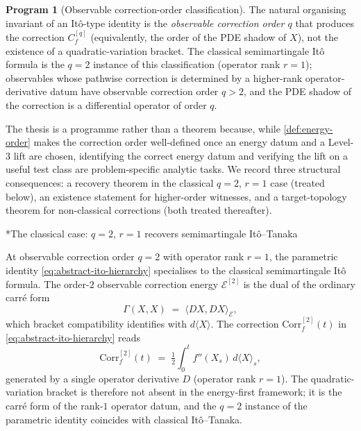 \documentclass[11pt,reqno]{amsart}
\makeatletter
\renewcommand\subsection{\@startsection{subsection}{2}%
  \z@{.7\linespacing}{.5\linespacing}%
  {\normalfont\centering\scshape}}
\theoremstyle{plain}
\theoremstyle{definition}
\newtheorem{program}[theorem]{Program}
\theoremstyle{remark}
\newcommand{\Energy}{\mathcal{E}}
\newcommand{\Carre}{\Gamma}
\makeatother
\begin{document}
\begin{program}[Observable correction-order classification]\label{prog:energy-order}
The natural organising invariant of an It\^o-type identity is the
\emph{observable correction order $q$} that produces the correction
$C_f^{[q]}$ (equivalently, the order of the PDE shadow of $X$), not
the existence of a quadratic-variation bracket. The classical
semimartingale It\^o formula is the $q=2$ instance of this
classification (operator rank $r=1$); observables whose pathwise
correction is determined by a higher-rank operator-derivative datum
have observable correction order $q>2$, and the PDE shadow of the
correction is a differential operator of order $q$.
\end{program}

The thesis is a programme rather than a theorem because, while
\cref{def:energy-order} makes the correction order well-defined once
an energy datum and a Level-3 lift are chosen, identifying the correct
energy datum and verifying the lift on a useful test class are
problem-specific analytic tasks. We record three structural
consequences: a recovery theorem in the classical $q=2$, $r=1$ case
(treated below), an existence statement for higher-order witnesses,
and a target-topology theorem for non-classical corrections (both
treated thereafter).

\subsection*{The classical case: \texorpdfstring{$q=2$, $r=1$}{q=2, r=1} recovers semimartingale It\^o--Tanaka}

At observable correction order $q=2$ with operator rank $r=1$, the
parametric identity \eqref{eq:abstract-ito-hierarchy} specialises to
the classical semimartingale It\^o formula. The order-$2$ observable
correction energy $\Energy^{[2]}$ is the dual of the ordinary
carr\'e form
\[
  \Carre(X,X)\;=\;\langle DX,DX\rangle_{\Energy},
\]
which bracket compatibility identifies with $d\langle X\rangle$. The
correction $\mathrm{Corr}_f^{[2]}(t)$ in
\eqref{eq:abstract-ito-hierarchy} reads
\[
  \mathrm{Corr}_f^{[2]}(t)
   \;=\;\tfrac12\!\int_0^{t}f''(X_s)\,d\langle X\rangle_s,
\]
generated by a single operator derivative $D$ (operator rank $r=1$).
The quadratic-variation bracket is therefore not absent in the
energy-first framework; it is the carr\'e form of the rank-$1$
operator datum, and the $q=2$ instance of the parametric identity
coincides with classical It\^o--Tanaka.
\end{document}
